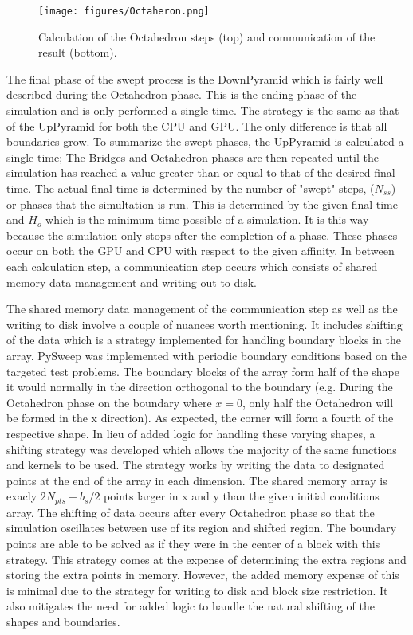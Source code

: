 \documentclass[review]{elsarticle}
\begin{document}
\begin{figure}[h!]
    \centering
       \texttt{[image: figures/Octaheron.png]}
    \label{fig:OCT}
    \caption{Calculation of the Octahedron steps (top) and communication of the result (bottom).}
\end{figure}

\par The final phase of the swept process is the DownPyramid which is fairly well described during the Octahedron phase. This is the ending phase of the simulation and is only performed a single time. The strategy is the same as that of the UpPyramid for both the CPU and GPU. The only difference is that all boundaries grow. To summarize the swept phases, the UpPyramid is calculated a single time; The Bridges and Octahedron phases are then repeated until the simulation has reached a value greater than or equal to that of the desired final time.
The actual final time is determined by the number of "swept" steps, ($N_{ss}$) or phases that the simultation is run. This is determined by the given final time and $H_{o}$ which is the minimum time possible of a simulation. It is this way because the simulation only stops after the completion of a phase. These phases occur on both the GPU and CPU with respect to the given affinity. In between each calculation step, a communication step occurs  which consists of shared memory data management and writing out to disk.

\par The shared memory data management of the communication step as well as the writing to disk involve a couple of nuances worth mentioning. It includes shifting of the data which is a strategy implemented for handling boundary blocks in the array. PySweep was implemented with periodic boundary conditions based on the targeted test problems. The boundary blocks of the array form half of the shape it would normally in the direction orthogonal to the boundary (e.g. During the Octahedron phase on the boundary where $x=0$, only half the Octahedron will be formed in the x direction). As expected, the corner will form a fourth of the respective shape. In lieu of added logic for handling these varying shapes, a shifting strategy was developed which allows the majority of the same functions and kernels to be used. The strategy works by writing the data to designated points at the end of the array in each dimension. The shared memory array is exacly $2N_{pts}+b_{s}/2$ points larger in x and y than the given initial conditions array. The shifting of data occurs after every Octahedron phase so that the simulation oscillates between use of its region and shifted region. The boundary points are able to be solved as if they were in the center of a block with this strategy. This strategy comes at the expense of determining the extra regions and storing the extra points in memory. However, the added memory expense of this is minimal due to the strategy for writing to disk and block size restriction. It also mitigates the need for added logic to handle the natural shifting of the shapes and boundaries.
\end{document}

